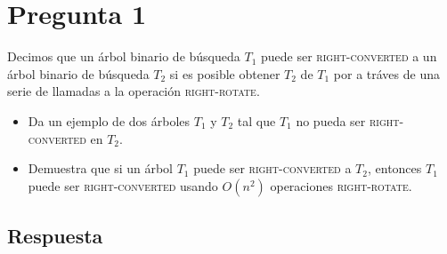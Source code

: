\section*{Pregunta 1}
\noindent Decimos que un árbol binario de búsqueda $T_1$ puede ser \textsc{right-converted} a un árbol binario de búsqueda $T_2$ si es posible obtener $T_2$ de $T_1$ por a tráves de una serie de llamadas a la operación \textsc{right-rotate}.
\begin{itemize}
    \item Da un ejemplo de dos árboles $T_1$ y $T_2$ tal que  $T_1$ no pueda ser \textsc{right-converted} en $T_2$.
    \item Demuestra que si un árbol $T_1$ puede ser \textsc{right-converted} a $T_2$, entonces $T_1$ puede ser \textsc{right-converted} usando $O(n^2)$ operaciones \textsc{right-rotate}.
\end{itemize} 


\subsection*{Respuesta}


